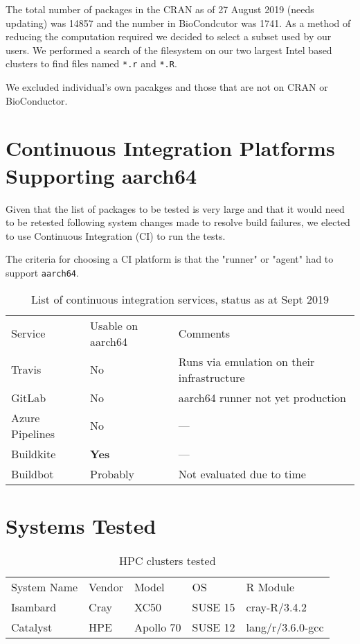 \documentclass{article}
\begin{document}
The total number of packages in the \textsc{CRAN} as of 27 August 2019 (needs updating) was 14857 and the number in BioCondcutor was 1741. As a method of reducing the computation required we decided to select a subset used by our users. We performed a search of the filesystem on our two largest Intel based clusters to find files named \texttt{*.r} and \texttt{*.R}.

We excluded individual's own pacakges and those that are not on \textsc{CRAN} or BioConductor.

\section{Continuous Integration Platforms Supporting aarch64}

Given that the list of packages to be tested is very large and that it would need to be retested following system changes made to resolve build failures, we elected to use Continuous Integration (\textsc{CI}) to run the tests.

The criteria for choosing a \textsc{CI} platform is that the "runner" or "agent" had to support \texttt{aarch64}.

\begin{table}[h]
\begin{tabular}{lll}
\cline{1-3}
Service & Usable on aarch64 & Comments\\ \cline{1-3}
Travis & No & Runs via emulation on their infrastructure\\
GitLab & No & aarch64 runner not yet production\\
Azure Pipelines & No & ---\\
Buildkite & \textbf{Yes} & --- \\
Buildbot & Probably & Not evaluated due to time \\ \cline{1-3}
\end{tabular}
\caption{List of continuous integration services, status as at Sept 2019}
\label{tab:ci-services}
\end{table}

\section{Systems Tested}

\begin{table}[h]
\begin{tabular}{lllll}
\cline{1-5}
System Name & Vendor & Model & OS & R Module \\ \cline{1-5}
Isambard & Cray & XC50 & SUSE 15 & cray-R/3.4.2 \\
Catalyst & HPE & Apollo 70 & SUSE 12 & lang/r/3.6.0-gcc \\ \cline{1-5}
\end{tabular}
\caption{HPC clusters tested }
\label{tab:systems}
\end{table}
\end{document}
